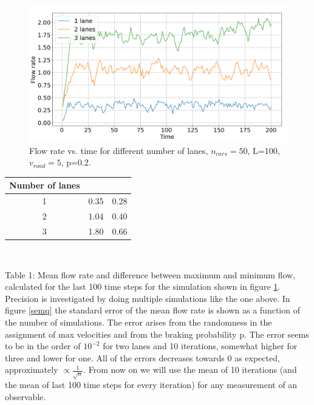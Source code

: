 \documentclass[a4paper,12pt]{article}
\begin{document}
\begin{figure}[H]
	\centering
        \includegraphics[scale=0.45]{fig1.png}
    \caption{Flow rate vs. time for different number of lanes, $n_{cars}=50$, L=100, $v_{road}=5$, p=0.2.}
    \label{fig1}
\end{figure}

\begin{center}
\def\arraystretch{1.5}
\begin{tabular}{ |c|c|c| } 
 \hline
	Number of lanes & \makecell{Mean flow rate} & \makecell{Max flow - min flow}\\
 \hline
	 1 & 0.35 & 0.28 \\
	 2 & 1.04 & 0.40 \\
	 3 & 1.80 &  0.66 \\
 \hline
\end{tabular}\\
\end{center}
Table 1: Mean flow rate and difference between maximum and minimum flow, calculated for the last 100 time steps for the simulation shown in figure \ref{fig1}.\\

Precision is investigated by doing multiple simulations like the one above. In figure \ref{semq} the standard error of the mean flow rate is shown as a function of the number of simulations. The error arises from the randomness in the assignment of max velocities and from the braking probability p. The error seems to be in the order of $10^{-2}$ for two lanes and 10 iterations, somewhat higher for three and lower for one. All of the errors decreases towards 0 as expected, approximately $\propto \frac{1}{\sqrt{n}}$. From now on we will use the mean of 10 iterations (and the mean of last 100 time steps for every iteration) for any measurement of an observable. 
\end{document}
